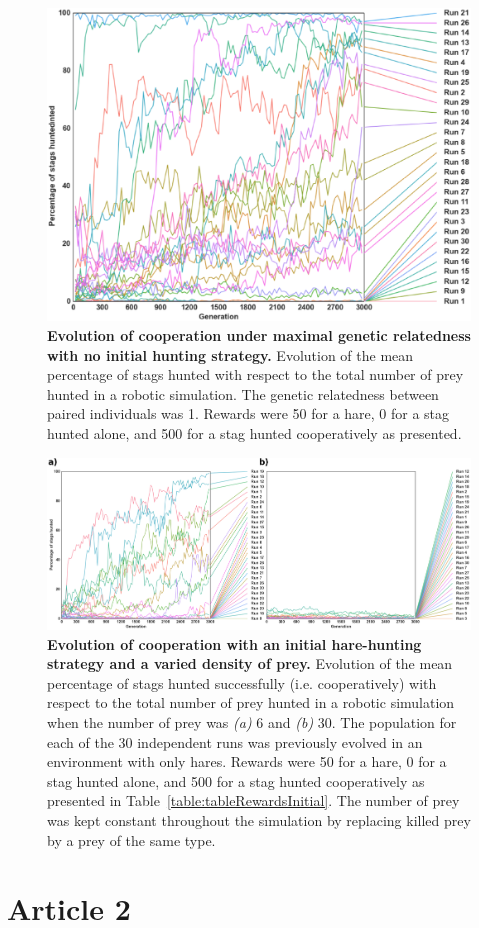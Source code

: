     \begin{figure}[hbtp]
      \centering
        \includegraphics[scale = 1]{fig/ArticleBio1/S2_Fig.eps}
      \caption{\textbf{Evolution of cooperation under maximal genetic relatedness with no initial hunting strategy.}
      Evolution of the mean percentage of stags hunted with respect to the total number of prey hunted in a robotic simulation. The genetic relatedness between paired individuals was 1. Rewards were 50 for a hare, 0 for a stag hunted alone, and 500 for a stag hunted cooperatively as presented.}
      \label{S2_Fig}
    \end{figure}

    \begin{figure}[hbtp]
      \centering
        \includegraphics[scale = 1]{fig/ArticleBio1/S3_Fig.eps}
      \caption{\textbf{Evolution of cooperation with an initial hare-hunting strategy and a varied density of prey.} 
      Evolution of the mean percentage of stags hunted successfully (i.e. cooperatively) with respect to the total number of prey hunted in a robotic simulation when the number of prey was {\em (a)} $6$ and {\em (b)} $30$. The population for each of the 30 independent runs was previously evolved in an environment with only hares. Rewards were 50 for a hare, 0 for a stag hunted alone, and 500 for a stag hunted cooperatively as presented in Table~\ref{table:tableRewardsInitial}. The number of prey was kept constant throughout the simulation by replacing killed prey by a prey of the same type.}
      \label{S3_Fig}
    \end{figure}


\section{Article 2}

